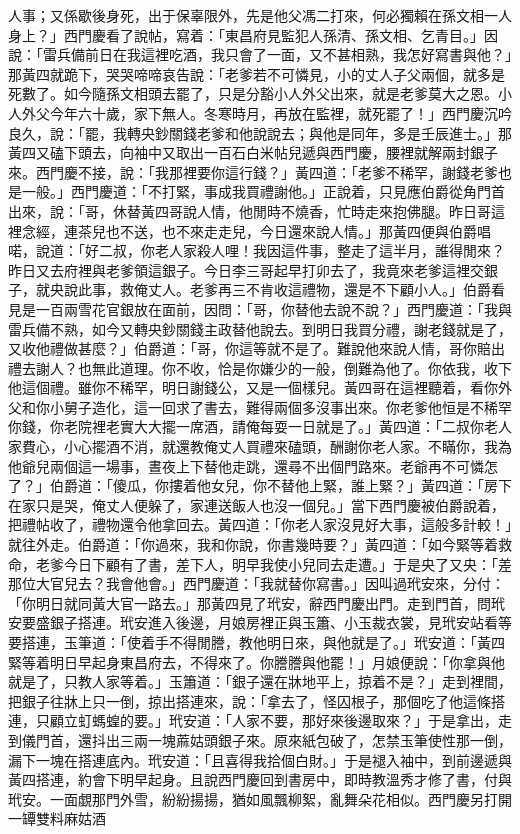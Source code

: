 \begin{showcontents}{}
人事；又係歇後身死，出于保辜限外，先是他父馮二打來，何必獨賴在孫文相一人身上？」西門慶看了說帖，寫着：「東昌府見監犯人孫清、孫文相、乞青目。」因說：「雷兵備前日在我這裡吃酒，我只會了一面，又不甚相熟，我怎好寫書與他？」那黃四就跪下，哭哭啼啼哀告說：「老爹若不可憐見，小的丈人子父兩個，就多是死數了。如今隨孫文相頭去罷了，只是分豁小人外父出來，就是老爹莫大之恩。小人外父今年六十歲，家下無人。冬寒時月，再放在監裡，就死罷了！」西門慶沉吟良久，說：「罷，我轉央鈔關錢老爹和他說說去；與他是同年，多是壬辰進士。」那黃四又磕下頭去，向袖中又取出一百石白米帖兒遞與西門慶，腰裡就解兩封銀子來。西門慶不接，說：「我那裡要你這行錢？」黃四道：「老爹不稀罕，謝錢老爹也是一般。」西門慶道：「不打緊，事成我買禮謝他。」正說着，只見應伯爵從角門首出來，說：「哥，休替黃四哥說人情，他閒時不燒香，忙時走來抱佛腿。昨日哥這裡念經，連茶兒也不送，也不來走走兒，今日還來說人情。」那黃四便與伯爵唱喏，說道：「好二叔，你老人家殺人哩！我因這件事，整走了這半月，誰得閒來？昨日又去府裡與老爹領這銀子。今日李三哥起早打卯去了，我竟來老爹這裡交銀子，就央說此事，救俺丈人。老爹再三不肯收這禮物，還是不下顧小人。」伯爵看見是一百兩雪花官銀放在面前，因問：「哥，你替他去說不說？」西門慶道：「我與雷兵備不熟，如今又轉央鈔關錢主政替他說去。到明日我買分禮，謝老錢就是了，又收他禮做甚麼？」伯爵道：「哥，你這等就不是了。難說他來說人情，哥你賠出禮去謝人？也無此道理。你不收，恰是你嫌少的一般，倒難為他了。你依我，收下他這個禮。雖你不稀罕，明日謝錢公，又是一個樣兒。黃四哥在這裡聽着，看你外父和你小舅子造化，這一回求了書去，難得兩個多沒事出來。你老爹他恒是不稀罕你錢，你老院裡老實大大擺一席酒，請俺每耍一日就是了。」黃四道：「二叔你老人家費心，小心擺酒不消，就還教俺丈人買禮來磕頭，酬謝你老人家。不瞞你，我為他爺兒兩個這一場事，晝夜上下替他走跳，還尋不出個門路來。老爺再不可憐怎了？」伯爵道：「傻瓜，你摟着他女兒，你不替他上緊，誰上緊？」黃四道：「房下在家只是哭，俺丈人便躲了，家連送飯人也沒一個兒。」當下西門慶被伯爵說着，把禮帖收了，禮物還令他拿回去。黃四道：「你老人家沒見好大事，這般多計較！」就往外走。伯爵道：「你過來，我和你說，你書幾時要？」黃四道：「如今緊等着救命，老爹今日下顧有了書，差下人，明早我使小兒同去走遭。」于是央了又央：「差那位大官兒去？我會他會。」西門慶道：「我就替你寫書。」因叫過玳安來，分付：「你明日就同黃大官一路去。」那黃四見了玳安，辭西門慶出門。走到門首，問玳安要盛銀子搭連。玳安進入後邊，月娘房裡正與玉簫、小玉裁衣裳，見玳安站看等要搭連，玉筆道：「使着手不得閒謄，教他明日來，與他就是了。」玳安道：「黃四緊等着明日早起身東昌府去，不得來了。你謄謄與他罷！」月娘便說：「你拿與他就是了，只教人家等着。」玉簫道：「銀子還在牀地平上，掠着不是？」走到裡間，把銀子往牀上只一倒，掠出搭連來，說：「拿去了，怪囚根子，那個吃了他這條搭連，只顧立虰螞蝗的要。」玳安道：「人家不要，那好來後邊取來？」于是拿出，走到儀門首，還抖出三兩一塊蔴姑頭銀子來。原來紙包破了，怎禁玉筆使性那一倒，漏下一塊在搭連底內。玳安道：「且喜得我拾個白財。」于是褪入袖中，到前邊遞與黃四搭連，約會下明早起身。且說西門慶回到書房中，即時教溫秀才修了書，付與玳安。一面覷那門外雪，紛紛揚揚，猶如風飄柳絮，亂舞朵花相似。西門慶另打開一罈雙料麻姑酒 
\end{showcontents}
